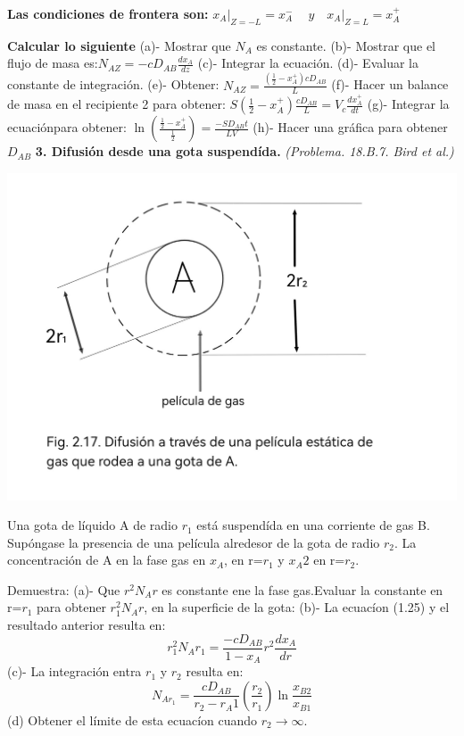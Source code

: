 \textbf{Las condiciones de frontera son:} \quad
$
x_A \bigg|_{Z=-L}= x_A^- \quad \ y \quad x_A \bigg|_{Z=L}= x_A^+ \quad
$

\textbf{Calcular lo siguiente}
\flushleft
(a)- Mostrar que $N_A$ es constante.
\flushleft
(b)- Mostrar que el flujo de masa es:\quad $ N_{A Z}= - c D_{AB} \frac{dx_A}{dz} $
\flushleft
(c)- Integrar la ecuación.
\flushleft
(d)- Evaluar la constante de integración.
\flushleft
(e)- Obtener:\quad 
$ N_{AZ} = \frac{(\frac{1}{2}-x_A^+)cD_{AB}} {L}$
\flushleft
(f)- Hacer un balance de masa en el recipiente 2 para obtener:\quad 
   $ S(\frac{1}{2}-x_A^+)\frac{cD_{AB}} {L} = V_c 
   \frac{dx_A^+}{dt} $
\flushleft
(g)- Integrar la ecuaciónpara obtener: \quad
$
\ln (\frac{\frac{1}{2}-x_A^+}{\frac{1}{2}})=\frac{-SD_{AB}t}{LV}
$
\flushleft
(h)- Hacer una gráfica para obtener $D_{AB}$ 
\vspace{0.2cm}
\newpage
\textbf{3. Difusión desde una gota suspendída.} \textit{(Problema. 18.B.7. Bird et al.)}
\flushleft
\begin{minipage}{0.45\textwidth} %
    \includegraphics[width=\linewidth]{./Capitulo2/Imagenes/imagen-6.jpg} %
\end{minipage}
\hfill %
\begin{minipage}{0.5\textwidth} %
Una gota de líquido A de radio $r_1$ está suspendída en una corriente de gas B. Supóngase la presencia de una película alredesor de la gota de radio $r_2$. La concentración de A en la fase gas en $x_A$, en r=$r_1$ y $x_A2$ en r=$r_2$.
\end{minipage}
Demuestra:
\flushleft
(a)- Que $r^{2}N_Ar$ es constante ene la fase gas.Evaluar la constante en r=$r_1$ para obtener $r^{2}_1N_Ar$, en la superficie de la gota:
\flushleft
(b)- La ecuacíon (1.25) y el resultado anterior resulta en: \[r^{2}_1N_Ar_1=\frac{-cD_{AB}}{1-x_A}r^{2}\frac{dx_A}{dr}\]
(c)- La integración entra $r_1$ y $r_2$ resulta en:
\[ N_{Ar_1}=\frac{cD_{AB}}{r_2-r_A1}(\frac{r_2}{r_1}){\ln {\frac{x_{B2}}{x_{B1}}}}\]
(d) Obtener el límite de esta ecuacíon cuando $r_2\rightarrow \infty$.
\newpage
